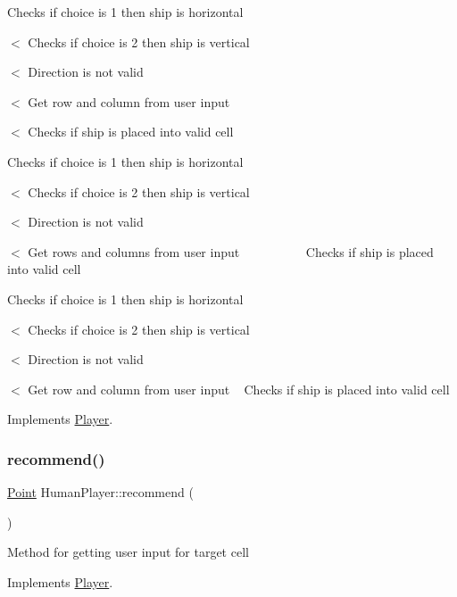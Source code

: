 Checks if choice is 1 then ship is horizontal

$<$ Checks if choice is 2 then ship is vertical

$<$ Direction is not valid

$<$ Get row and column from user input

$<$ Checks if ship is placed into valid cell

Checks if choice is 1 then ship is horizontal

$<$ Checks if choice is 2 then ship is vertical

$<$ Direction is not valid

$<$ Get rows and columns from user input ~\newline
~\newline
~\newline
~\newline
~\newline
~\newline
 Checks if ship is placed into valid cell

Checks if choice is 1 then ship is horizontal

$<$ Checks if choice is 2 then ship is vertical

$<$ Direction is not valid

$<$ Get row and column from user input ~\newline
 Checks if ship is placed into valid cell 

Implements \mbox{\hyperlink{class_player_ab89c1180c7314d3e19bcf4b2bed2e02a}{Player}}.

\mbox{\label{class_human_player_a718f16f3ddeeb34c9f2e93cf1d805b46}} 
\subsubsection{\texorpdfstring{recommend()}{recommend()}}
{\footnotesize\ttfamily \mbox{\hyperlink{class_point}{Point}} Human\+Player\+::recommend (\begin{DoxyParamCaption}{ }\end{DoxyParamCaption})\hspace{0.3cm}{\ttfamily [virtual]}}

Method for getting user input for target cell 

Implements \mbox{\hyperlink{class_player_a2cc7a83d11158eafd8d49d4b9f23ce56}{Player}}.

